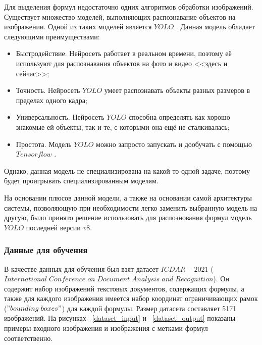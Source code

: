 Для выделения формул недостаточно одних алгоритмов обработки изображений. Существует множество моделей, выполняющих распознавание объектов на изображении.
Одной из таких моделей является $YOLO$ \cite{yolo}. Данная модель обладает следующими преимуществами:
\begin{itemize}
    \item Быстродействие. Нейросеть работает в реальном времени, поэтому её используют для распознавания объектов на фото и видео <<здесь и сейчас>>;
    \item Точность. Нейросеть $YOLO$ умеет распознавать объекты разных размеров в пределах одного кадра;
    \item Универсальность. Нейросеть $YOLO$ способна определять как хорошо знакомые ей объекты, так и те, с которыми она ещё не сталкивалась;
    \item Простота. Модель $YOLO$ можно запросто запускать и дообучать с помощью $Tensorflow$ \cite{tensorflow}.
\end{itemize}

Однако, данная модель не специализирована на какой-то одной задаче, поэтому будет проигрывать специализированным моделям.

На основании плюсов данной модели, а также на основании самой архитектуры системы, позволяющую при необходимости легко заменить выбранную модель на другую, было принято решение использовать для распознования формул модель $YOLO$ последней версии $v8$.

\subsubsection{Данные для обучения}

В качестве данных для обучения был взят датасет $ICDAR-2021$ ($International\;Conference\;on\;Document\;Analysis\;and\;Recognition$). Он содержит набор изображений текстовых документов, содержащих формулы, 
а также для каждого изображения имеется набор координат ограничивающих рамок ($"bounding\; boxes"$) для каждой формулы.
Размер датасета составляет 5171 изображений.
На рисунках ~\ref{dataset_input} и ~\ref{dataset_output} показаны примеры входного изображения и изображения с метками формул соответственно.

